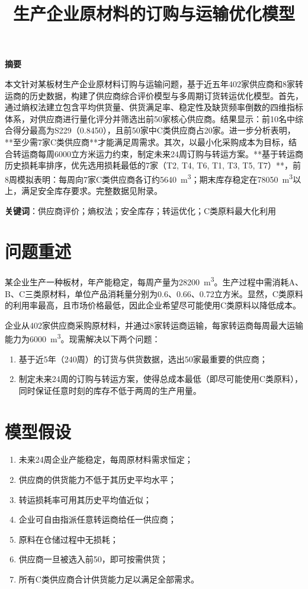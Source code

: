 \documentclass[12pt]{article}
\title{生产企业原材料的订购与运输优化模型}
\author{}
\date{}
\begin{document}
\maketitle

\begin{center}
\textbf{ 摘\quad 要}
\end{center}

本文针对某板材生产企业原材料订购与运输问题，基于近五年402家供应商和8家转运商的历史数据，构建了供应商综合评价模型与多周期订货转运优化模型。首先，通过熵权法建立包含平均供货量、供货满足率、稳定性及缺货频率倒数的四维指标体系，对供应商进行量化评分并筛选出前50家核心供应商。结果显示：前10名中综合得分最高为S229（0.8450），且前50家中C类供应商占20家。进一步分析表明，**至少需7家C类供应商**才能满足周需求。其次，以最小化采购成本为目标，结合转运商每周6000立方米运力约束，制定未来24周订购与转运方案。**基于转运商历史损耗率排序，优先选用损耗最低的7家（T2, T4, T6, T1, T3, T5, T7）**，前8周模拟表明：每周向7家C类供应商各订约\SI{5640}{\cubic\meter}；期末库存稳定在\SI{78050}{\cubic\meter}以上，满足安全库存要求。完整数据见附录。

\noindent\textbf{关键词}：供应商评价；熵权法；安全库存；转运优化；C类原料最大化利用

\section{问题重述}
某企业生产一种板材，年产能稳定，每周产量为\SI{28200}{\cubic\meter}。生产过程中需消耗A、B、C三类原材料，单位产品消耗量分别为0.6、0.66、0.72立方米。显然，C类原料的利用率最高，且市场价格最低，因此企业希望尽可能使用C类原料以降低成本。

企业从402家供应商采购原材料，并通过8家转运商运输，每家转运商每周最大运输能力为\SI{6000}{\cubic\meter}。现需解决以下两个问题：
\begin{enumerate}
    \item 基于近5年（240周）的订货与供货数据，选出50家最重要的供应商；
    \item 制定未来24周的订购与转运方案，使得总成本最低（即尽可能使用C类原料），同时保证任意时刻的库存不低于两周的生产用量。
\end{enumerate}

\section{模型假设}
\begin{enumerate}
    \item 未来24周企业产能稳定，每周原材料需求恒定；
    \item 供应商的供货能力不低于其历史平均水平；
    \item 转运损耗率可用其历史平均值近似；
    \item 企业可自由指派任意转运商给任一供应商；
    \item 原料在仓储过程中无损耗；
    \item 供应商一旦被选入前50，即可按需供货；
    \item 所有C类供应商合计供货能力足以满足全部需求。
\end{enumerate}
\end{document}
